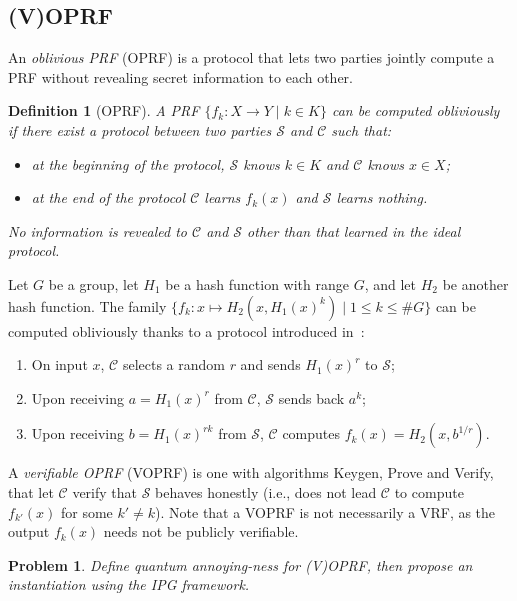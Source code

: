 \documentclass{article}
\newtheorem{prob}[ex]{Problem}
\newtheorem{defi}{Definition}
\begin{document}
\subsection{(V)OPRF}

An \emph{oblivious PRF} (OPRF) is a protocol that lets two parties
jointly compute a PRF without revealing secret information to each
other.

\begin{defi}[OPRF]
  A PRF $\{f_k: X\to Y \;|\; k\in K\}$ can be computed
  \emph{obliviously} if there exist a protocol between two parties
  $\mathcal{S}$ and $\mathcal{C}$ such that:
  \begin{itemize}
  \item at the beginning of the protocol, $\mathcal{S}$ knows $k\in K$ and
    $\mathcal{C}$ knows $x\in X$;
  \item at the end of the protocol $\mathcal{C}$ learns $f_k(x)$ and
    $\mathcal{S}$ learns nothing.
  \end{itemize}
  No information is revealed to $\mathcal{C}$ and $\mathcal{S}$ other
  than that learned in the ideal protocol.
\end{defi}

Let $G$ be a group, let $H_1$ be a hash function with range $G$, and
let $H_2$ be another hash function.  The family
$\{f_k : x\mapsto H_2(x,H_1(x)^k) \;|\; 1\le k\le \#G \}$ can be
computed obliviously thanks to a protocol introduced
in~\cite{jarecki2016highly}:
\begin{enumerate}
\item On input $x$, $\mathcal{C}$ selects a random $r$ and sends
  $H_1(x)^r$ to $\mathcal{S}$;
\item Upon receiving $a=H_1(x)^r$ from $\mathcal{C}$, $\mathcal{S}$ sends
  back $a^k$;
\item Upon receiving $b = H_1(x)^{rk}$ from $\mathcal{S}$,
  $\mathcal{C}$ computes $f_k(x) = H_2(x, b^{1/r})$.
\end{enumerate}

A \emph{verifiable OPRF} (VOPRF) is one with algorithms Keygen, Prove
and Verify, that let $\mathcal{C}$ verify that $\mathcal{S}$ behaves
honestly (i.e., does not lead $\mathcal{C}$ to compute $f_{k'}(x)$ for
some $k'\ne k$).  Note that a VOPRF is not necessarily a VRF, as the
output $f_k(x)$ needs not be publicly verifiable.

\begin{prob}
  Define quantum annoying-ness for (V)OPRF, then propose an
  instantiation using the IPG framework.
\end{prob}
\end{document}
